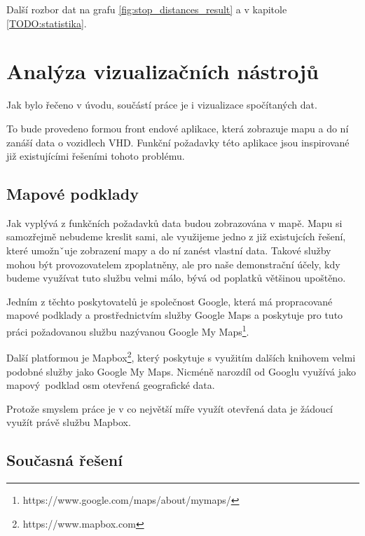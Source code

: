Další rozbor dat na grafu \ref{fig:stop_distances_result} a v kapitole \ref{TODO:statistika}.




\section{Analýza vizualizačních nástrojů}

Jak bylo řečeno v úvodu, součástí práce je i vizualizace spočítaných dat.

\bigbreak

To bude provedeno formou front endové aplikace, která zobrazuje mapu a do ní zanáší data o vozidlech VHD. Funkční požadavky této aplikace jsou inspirované již existujícími řešeními tohoto problému.

\subsection{Mapové podklady}

Jak vyplývá z funkčních požadavků data budou zobrazována v mapě. Mapu si samozřejmě nebudeme kreslit sami, ale využijeme jedno z již existujcích řešení, které umožnˇuje zobrazení mapy a do ní zanést vlastní data. Takové služby mohou být provozovatelem zpoplatněny, ale pro naše demonstrační účely, kdy budeme využívat tuto službu velmi málo, bývá od poplatků většinou upoštěno.

\bigbreak

Jedním z těchto poskytovatelů je společnost Google, která má propracované mapové podklady a prostřednictvím služby Google Maps a poskytuje pro tuto práci požadovanou službu nazývanou Google My Maps\footnote{https://www.google.com/maps/about/mymaps/}.

\bigbreak

Další platformou je Mapbox\footnote{https://www.mapbox.com}, který poskytuje s využitím dalších knihovem velmi podobné služby jako Google My Maps. Nicméně narozdíl od Googlu využívá jako mapový podklad \gls{osm} {otevřená geografické data}.

\bigbreak

Protože smyslem práce je v co největší míře využít otevřená data je žádoucí využít právě službu Mapbox.

\subsection{Současná řešení} \label{subsection:soucasna_reseni_front_end}

